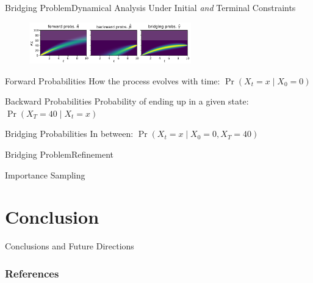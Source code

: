 \documentclass{beamer}
\newcommand{\bottomcite}[1]{\vspace*{\fill} {\scriptsize \parencite{#1}}}
\begin{document}
\begin{frame}{Bridging Problem}{Dynamical Analysis Under Initial \emph{and} Terminal Constraints}
    \begin{figure}
        \includegraphics[width=7cm]{../gfx/bridging_bd.pdf}
    \end{figure}
    \begin{block}{Forward Probabilities}
        How the process evolves with time: $\Pr({X_t=x\mid X_0=0})$
    \end{block}
    \begin{block}{Backward Probabilities}
        Probability of ending up in a given state: $\Pr(X_T=40 \mid X_t = x)$
    \end{block}
    \begin{block}{Bridging Probabilities}
        In between: $\Pr (X_t=x\mid X_0=0, X_T=40)$
    \end{block}
    \bottomcite{backenkohler2020analysis}
\end{frame}

\begin{frame}{Bridging Problem}{Refinement}
    \bottomcite{backenkoehler2020analysis}
\end{frame}

\begin{frame}{Importance Sampling}
    
\end{frame}

\section{Conclusion}
\begin{frame}{Conclusions and Future Directions}
\end{frame}

\begin{frame}[allowframebreaks]
    \frametitle{References}
%        
    \printbibliography
\end{frame}

\end{document}

